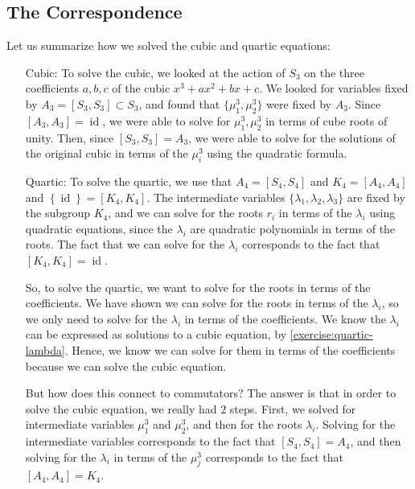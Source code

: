 \documentclass[reqno, 12pt, letter]{article}
\theoremstyle{plain}
\theoremstyle{definition}
\theoremstyle{remark}
\numberwithin{equation}{section}
\DeclareMathOperator\id{id}
\begin{document}
			
			
		
		
		
		
		
		\subsection{The Correspondence}
		Let us summarize how we solved the cubic and quartic equations:		
		\begin{enumerate}
			\item[Cubic:] To solve the cubic, we looked at the action of $S_3$ on the three coefficients $a,b,c$ of the cubic $x^3 + ax^2 + bx+c$. 
				We looked for variables fixed by $A_3 = \left[ S_3, S_3 \right] \subset S_3$,
				and found that $\{\mu_1^3, \mu_2^3 \}$ were fixed by $A_3$.
				Since $\left[ A_3, A_3 \right]= \id$, we were able to solve for $\mu_1^3, \mu_2^3$ in terms of cube roots of unity.
				Then, since $\left[ S_3, S_3 \right]=A_3$,
				we were able to solve for the solutions of the original cubic in terms of the $\mu_i^3$ using the quadratic formula.
			\item[Quartic:]	
				To solve the quartic, we use that $A_4 = \left[ S_4, S_4 \right]$ and $K_4 = \left[ A_4, A_4 \right]$ and
				$\left\{ \id \right\}= \left[ K_4, K_4 \right]$.
				The intermediate variables $ \{\lambda_1, \lambda_2, \lambda_3 \}$ are fixed by the subgroup $K_4$,
				and 
				we can solve for the roots $r_i$ in terms of the $\lambda_i$
				using quadratic equations, since the $\lambda_i$ are quadratic polynomials in terms of the roots.
				The fact that we can solve for the $\lambda_i$ corresponds to the fact that $\left[ K_4, K_4 \right] = \id$.

				So, to solve the quartic, we want to solve for the roots in terms of the coefficients.
				We have shown we can solve for the roots in terms of the $\lambda_i$, so we only need to solve
				for the $\lambda_i$ in terms of the coefficients.
				We know the $\lambda_i$ can be expressed as solutions to a cubic equation, by \autoref{exercise:quartic-lambda}.
				Hence, we know we can solve for them in terms of the coefficients because we can solve the cubic equation.

				But how does this connect to commutators?
				The answer is that in order to solve the cubic equation, we really had $2$ steps.
				First, we solved for intermediate variables
				$\mu_1^3$ and $\mu_2^3$, and then for the roots $\lambda_i$.
				Solving for the intermediate variables corresponds to the fact that $\left[ S_4, S_4 \right] = A_4$,
				and then solving for the $\lambda_i$ in terms of the $\mu_j^3$ corresponds to the fact that
				$\left[ A_4, A_4 \right] = K_4$.
		\end{enumerate}
		
\end{document}
